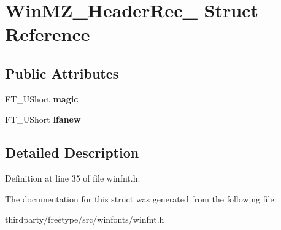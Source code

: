 \hypertarget{struct_win_m_z___header_rec__}{}\section{Win\+M\+Z\+\_\+\+Header\+Rec\+\_\+ Struct Reference}
\label{struct_win_m_z___header_rec__}
\subsection*{Public Attributes}
\begin{DoxyCompactItemize}
\item 
\mbox{\label{struct_win_m_z___header_rec___a5c88e9ba776cf18831f4ae4e4728e6e9}} 
F\+T\+\_\+\+U\+Short {\bfseries magic}
\item 
\mbox{\label{struct_win_m_z___header_rec___a41ad7b14830b8177bfefb6a0b9e198a1}} 
F\+T\+\_\+\+U\+Short {\bfseries lfanew}
\end{DoxyCompactItemize}


\subsection{Detailed Description}


Definition at line 35 of file winfnt.\+h.



The documentation for this struct was generated from the following file\+:\begin{DoxyCompactItemize}
\item 
thirdparty/freetype/src/winfonts/winfnt.\+h\end{DoxyCompactItemize}
